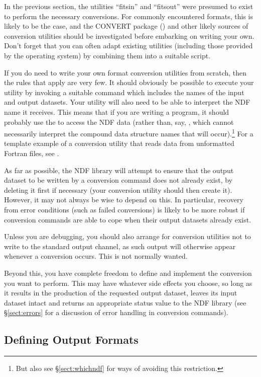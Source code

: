 In the previous section, the utilities ``fitsin'' and ``fitsout'' were
presumed to exist to perform the necessary conversions. For commonly
encountered formats, this is likely to be the case, and the CONVERT
package () and other likely sources of
conversion utilities should be investigated before embarking on
writing your own.  Don't forget that you can often adapt existing
utilities (including those provided by the operating system) by
combining them into a suitable script.

If you do need to write your own format conversion utilities from
scratch, then the rules that apply are very few. It should obviously
be possible to execute your utility by invoking a suitable command
which includes the names of the input and output datasets.  Your
utility will also need to be able to interpret the NDF name it
receives. This means that if you are writing a program, it should
probably use the  to access the NDF data
(rather than, say, , which cannot necessarily
interpret the compound data structure names that will
occur).\footnote{But also see \S\ref{sect:whichndf} for ways of
avoiding this restriction.}  For a template example of a conversion
utility that reads data from unformatted Fortran files, see
.

As far as possible, the NDF library will attempt to ensure that the
output dataset to be written by a conversion command does not already
exist, by deleting it first if necessary (your conversion utility
should then create it). However, it may not always be wise to depend
on this. In particular, recovery from error conditions (such as failed
conversions) is likely to be more robust if conversion commands are
able to cope when their output datasets already exist.

Unless you are debugging, you should also arrange for conversion
utilities not to write to the standard output channel, as such output
will otherwise appear whenever a conversion occurs. This is not
normally wanted.

Beyond this, you have complete freedom to define and implement the
conversion you want to perform. This may have whatever side effects
you choose, so long as it results in the production of the requested
output dataset, leaves its input dataset intact and returns an
appropriate status value to the NDF library (see \S\ref{sect:errors}
for a discussion of error handling in conversion commands).

\subsection{\label{sect:definingoutput}Defining Output Formats}

